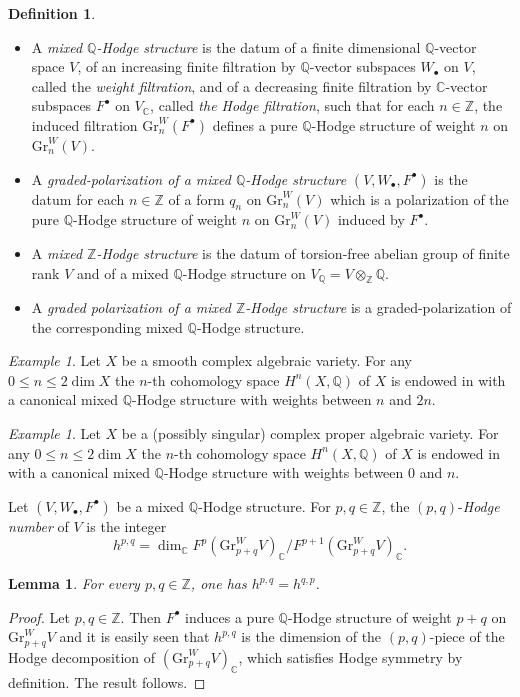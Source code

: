 \documentclass[10pt]{article}
\numberwithin{equation}{subsection}
\theoremstyle{plain}
\newtheorem{lemma}[theorem]{Lemma}
\theoremstyle{definition}
\newtheorem{definition}[theorem]{Definition}
\theoremstyle{remark}
\newtheorem{example}[theorem]{Example}
\newcommand{\Z}{\mathbb Z}
\newcommand{\Q}{\mathbb Q}
\newcommand{\C}{\mathbb C}
\newcommand{\bul}{\bullet}
\newcommand{\gr}{\mathrm{Gr}}
\newcommand{\Gr}{\mathrm{Gr}}
\begin{document}
\begin{definition}
\begin{itemize}\item[(a)]A \textit{mixed $\Q$-Hodge structure} is the datum of a finite dimensional $\Q$-vector space $V$, of an increasing finite filtration by $\Q$-vector subspaces $W_\bul$ on $V$, called the \textit{weight filtration}, and of a decreasing finite filtration by $\C$-vector subspaces $F^\bul$ on $V_\C$, called \textit{the Hodge filtration}, such that for each $n \in \Z$, the induced filtration $\gr^W_n(F^\bul)$ defines a pure $\Q$-Hodge structure of weight $n$ on $\gr^W_n(V)$.  \item[(b)] A \textit{graded-polarization of a mixed $\Q$-Hodge structure} $(V, W_\bul, F^\bul)$ is the datum for each $n \in \Z$ of a form $q_n$ on $\gr^W_n(V)$ which is a polarization of the pure $\Q$-Hodge structure of weight $n$ on $\gr^W_n(V)$ induced by $F^\bul$. \item[(c)] A \textit{mixed $\Z$-Hodge structure} is the datum of torsion-free abelian group of finite rank $V$ and of a mixed $\Q$-Hodge structure on $V_\Q = V \otimes_\Z \Q$. \item[(d)] A \textit{graded polarization of a mixed $\Z$-Hodge structure} is a graded-polarization of the corresponding mixed $\Q$-Hodge structure.\end{itemize}
\end{definition}
\begin{example}
Let $X$ be a smooth complex algebraic variety. For any $0 \leqslant n \leqslant 2\dim X$ the $n$-th cohomology space $H^n(X,\Q)$ of $X$ is endowed in \cite{hodge2} with a canonical mixed $\Q$-Hodge structure with weights between $n$ and $2n$.
\end{example}
\begin{example}
Let $X$ be a (possibly singular) complex proper algebraic variety. For any $0 \leqslant n \leqslant 2\dim X$ the $n$-th cohomology space $H^n(X,\Q)$ of $X$ is endowed in \cite{hodge3} with a canonical mixed $\Q$-Hodge structure with weights between $0$ and $n$.
\end{example}
Let $(V,W_\bul,F^\bul)$ be a mixed $\Q$-Hodge structure. For $p,q \in \Z$, the $(p,q)$-\textit{Hodge number} of $V$ is the integer
\[
h^{p,q} = \dim_\C F^p (\Gr^W_{p+q}V)_\C/F^{p+1}(\Gr^W_{p+q}V)_\C.
\]
\begin{lemma}\label{hsymnum}
For every $p,q \in \Z$, one has $h^{p,q} = h^{q,p}$.
\end{lemma}
\begin{proof}
Let $p,q \in \Z$. Then $F^\bul$ induces a pure $\Q$-Hodge structure of weight $p+q$ on $\Gr^W_{p+q}V$ and it is easily seen that $h^{p,q}$ is the dimension of the $(p,q)$-piece of the Hodge decomposition of $(\Gr^W_{p+q}V)_\C$, which satisfies Hodge symmetry by definition. The result follows.
\end{proof}
\end{document}
